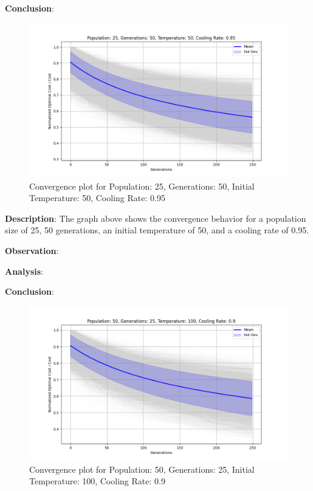 \documentclass[
]{article}
\begin{document}
\textbf{Conclusion}:

\begin{figure}[H]
    \centering
    \includegraphics[width=\textwidth]{genetic_simulated_annealing_hybrid/Population_25_Generations_50_Temperature_50_CoolingRate_0.95}
    \caption{Convergence plot for Population: 25, Generations: 50, Initial Temperature: 50, Cooling Rate: 0.95}
    \label{fig:ga_sa_25_50_50_095}
\end{figure}

\textbf{Description}: The graph above shows the convergence behavior for a population size of 25, 50 generations, an initial temperature of 50, and a cooling rate of 0.95.

\textbf{Observation}:

\textbf{Analysis}:

\textbf{Conclusion}:

\begin{figure}[H]
    \centering
    \includegraphics[width=\textwidth]{genetic_simulated_annealing_hybrid/Population_50_Generations_25_Temperature_100_CoolingRate_0.9}
    \caption{Convergence plot for Population: 50, Generations: 25, Initial Temperature: 100, Cooling Rate: 0.9}
    \label{fig:ga_sa_50_25_100_09}
\end{figure}
\end{document}
